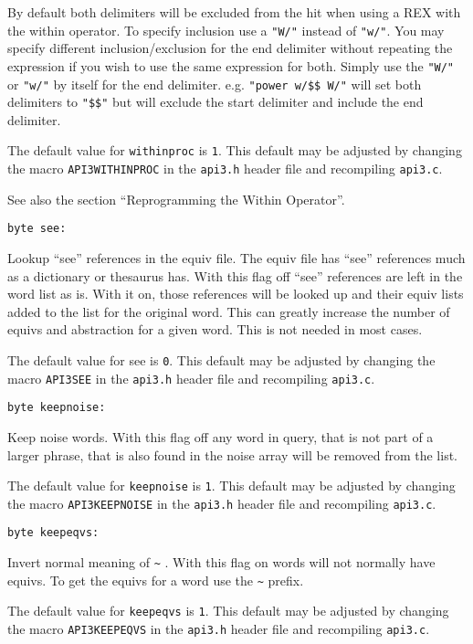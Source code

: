 By default both delimiters will be excluded from the hit when
using a REX with the within operator.  To specify inclusion use a
\verb`"W/"` instead of \verb`"w/"`.  You may specify different
inclusion/exclusion for the end delimiter without repeating the
expression if you wish to use the same expression for both.
Simply use the \verb`"W/"` or \verb`"w/"` by itself for the end delimiter. e.g.
\verb`"power w/$$ W/"` will set both delimiters to \verb`"$$"` but will exclude
the start delimiter and include the end delimiter.

The default value for \verb`withinproc` is \verb`1`. This default may be
adjusted by changing the macro \verb`API3WITHINPROC` in the \verb`api3.h` header
file and recompiling \verb`api3.c`.

See also the section ``Reprogramming the Within Operator''.

\begin{verbatim}
byte see:
\end{verbatim}
Lookup ``see'' references in the equiv file.  The equiv file has
``see'' references much as a dictionary or thesaurus has.  With this
flag off ``see'' references are left in the word list as is.  With
it on, those references will be looked up and their equiv lists
added to the list for the original word.  This can greatly
increase the number of equivs and abstraction for a given word.
This is not needed in most cases.

The default value for see is \verb`0`. This default may be adjusted by
changing the macro \verb`API3SEE` in the \verb`api3.h` header file and
recompiling \verb`api3.c`.

\begin{verbatim}
byte keepnoise:
\end{verbatim}
Keep noise words.  With this flag off any word in query, that is
not part of a larger phrase, that is also found in the noise array
will be removed from the list.

The default value for \verb`keepnoise` is \verb`1`. This default may be adjusted
by changing the macro \verb`API3KEEPNOISE` in the \verb`api3.h` header file and
recompiling \verb`api3.c`.

\begin{verbatim}
byte keepeqvs:
\end{verbatim}
Invert normal meaning of \verb`~` . With this flag on words will not
normally have equivs.  To get the equivs for a word use the \verb`~`
prefix.

The default value for \verb`keepeqvs` is \verb`1`. This default may be adjusted
by changing the macro \verb`API3KEEPEQVS` in the \verb`api3.h` header file and
recompiling \verb`api3.c`.

